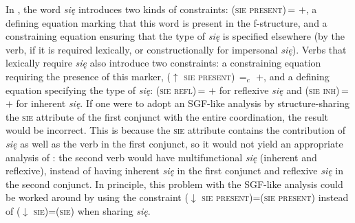 \documentclass[output=paper]{../langscibook}
\begin{document}
In \citet{PatejukPrzepiorkowski2015}, the word \emph{się} introduces two kinds of
constraints: \textsc{(\UP sie present)\,= $+$}, a defining
equation marking that this word is pres\-ent in the f-structure, and a
constraining equation ensuring that the type of \emph{się} is
specified elsewhere (by the verb, if it is required lexically, or
constructionally for impersonal \emph{się}). Verbs that lexically
require \emph{się} also introduce two constraints: a constraining
equation requiring the presence of this marker, \textsc{($\uparrow$
  sie present)\,$=_{c}$ $+$}, and a defining equation specifying the
type of \emph{się}: \textsc{(\UP sie refl)\,= $+$} for
reflexive \emph{się} and \textsc{(\UP sie inh)\,= $+$} for
inherent \emph{się}. If one were to adopt an SGF-like analysis by
structure-sharing the \textsc{sie} attribute of the first conjunct
with the entire coordination, the result would be
incorrect. This is because the \textsc{sie} attribute contains the
contribution of \emph{się} as well as the verb in the first conjunct,
so it would not yield an appropriate analysis of
: the second verb would have
multifunctional \emph{się} (inherent and reflexive), instead of having
inherent \emph{się} in the first conjunct and reflexive \emph{się} in
the second conjunct.
%
In principle, this problem with the SGF-like analysis could be worked
around by using the constraint \textsc{($\downarrow$ sie
  present)=(\UP sie present)} instead of
\textsc{($\downarrow$ sie)=(\UP sie)} when sharing \emph{się}.
\end{document}
